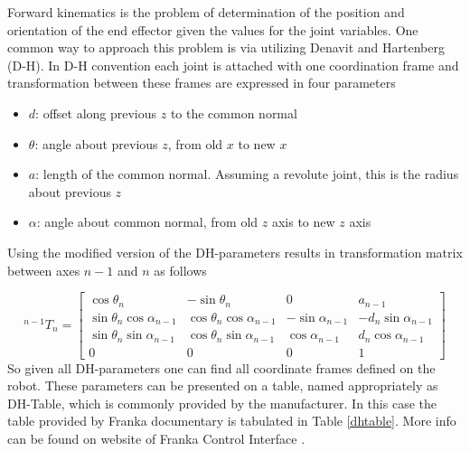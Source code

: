 Forward kinematics is the problem of determination of the position and orientation of the end effector given the values for the joint variables. One common way to approach this problem is via utilizing Denavit and Hartenberg (D-H).
In D-H convention each joint is attached with one coordination frame and transformation between these frames are
expressed in four parameters \cite{wikidh}
\begin{itemize}
    \item $d$: offset along previous $z$ to the common normal
    \item $\theta$: angle about previous $z$, from old $x$ to new $x$
    \item $a$: length of the common normal. Assuming a revolute joint, this is the radius about previous $z$
    \item $\alpha$: angle about common normal, from old $z$ axis to new $z$ axis
\end{itemize}
Using the modified version of the DH-parameters results in transformation matrix between axes $n-1$ and $n$ as follows

\begin{equation}
    ^{n - 1}T_n=
    \left[\begin{smallmatrix}
              \cos\theta_n & -\sin\theta_n  & 0 & a_{n-1} \\
              \sin\theta_n \cos\alpha_{n-1} & \cos\theta_n \cos\alpha_{n-1} & -\sin\alpha_{n-1}& -d_n
              \sin\alpha_{n-1} \\
              \sin\theta_n\sin\alpha_{n-1} & \cos\theta_n \sin\alpha_{n-1} & \cos\alpha_{n-1} & d_n
              \cos\alpha_{n-1} \\
              0 & 0 & 0 & 1
    \end{smallmatrix} \right]
\end{equation}
So given all DH-parameters one can find all coordinate frames defined on the robot. These parameters can be presented
on a table, named appropriately as DH-Table, which is commonly provided by the manufacturer. In this case the table
provided by Franka documentary is tabulated in Table \ref{dhtable}. More info can be found on website of Franka Control Interface \cite{frankaweb}.

